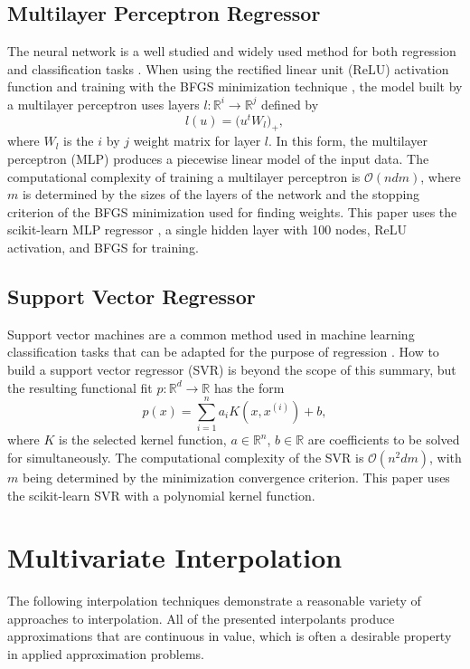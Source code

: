 \documentclass[sigconf]{acmart}
\begin{document}
\subsection{Multilayer Perceptron Regressor}
The neural network is a well studied and widely used method for both regression and classification tasks \cite{hornik1989multilayer}. When using the rectified linear unit (ReLU) activation function \cite{dahl2013improving} and training with the BFGS minimization technique \cite{moller1993scaled}, the model built by a multilayer perceptron uses layers $l : \mathbb{R}^{i} \rightarrow \mathbb{R}^{j}$ defined by
$$ l(u) = \big( u^t W_l \big)_+ ,$$
where $W_l$ is the $i$ by $j$ weight matrix for layer $l$. In this form, the multilayer perceptron (MLP) produces a piecewise linear model of the input data. The computational complexity of training a multilayer perceptron is $\mathcal{O}(n d m)$, where $m$ is determined by the sizes of the layers of the network and the stopping criterion of the BFGS minimization used for finding weights. This paper uses the scikit-learn MLP regressor \cite{scikit-learn}, a single hidden layer with 100 nodes, ReLU activation, and BFGS for training. 

\subsection{Support Vector Regressor}
Support vector machines are a common method used in machine learning classification tasks that can be adapted for the purpose of regression \cite{basak2007support}. How to build a support vector regressor (SVR) is beyond the scope of this summary, but the resulting functional fit $p : \mathbb{R}^d \rightarrow \mathbb{R}$ has the form
$$ p(x)  = \sum_{i=1}^{n}a_i K(x,x^{(i)}) + b ,$$
where $K$ is the selected kernel function, $a \in \mathbb{R}^n$, $b \in \mathbb{R}$ are coefficients to be solved for simultaneously. The computational complexity of the SVR is $\mathcal{O}(n^2dm)$, with $m$ being determined by the minimization convergence criterion. This paper uses the scikit-learn SVR \cite{scikit-learn} with a polynomial kernel function.

\section{Multivariate Interpolation}
The following interpolation techniques demonstrate a reasonable variety of approaches to interpolation. All of the presented interpolants produce approximations that are continuous in value, which is often a desirable property in applied approximation problems.
\end{document}
